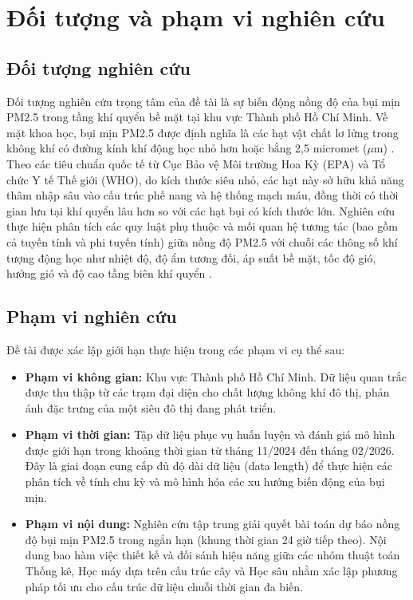     \section{Đối tượng và phạm vi nghiên cứu}
    \subsection{Đối tượng nghiên cứu}
    Đối tượng nghiên cứu trọng tâm của đề tài là sự biến động nồng độ của bụi mịn PM2.5 trong tầng khí quyển bề mặt tại khu vực Thành phố Hồ Chí Minh. Về mặt khoa học, bụi mịn PM2.5 được định nghĩa là các hạt vật chất lơ lửng trong không khí có đường kính khí động học nhỏ hơn hoặc bằng 2,5 micromet ($\mu$m) \cite{Seinfeld2016}. Theo các tiêu chuẩn quốc tế từ Cục Bảo vệ Môi trường Hoa Kỳ (EPA) và Tổ chức Y tế Thế giới (WHO), do kích thước siêu nhỏ, các hạt này sở hữu khả năng thâm nhập sâu vào cấu trúc phế nang và hệ thống mạch máu, đồng thời có thời gian lưu tại khí quyển lâu hơn so với các hạt bụi có kích thước lớn.
    Nghiên cứu thực hiện phân tích các quy luật phụ thuộc và mối quan hệ tương tác (bao gồm cả tuyến tính và phi tuyến tính) giữa nồng độ PM2.5 với chuỗi các thông số khí tượng động học như nhiệt độ, độ ẩm tương đối, áp suất bề mặt, tốc độ gió, hướng gió và độ cao tầng biên khí quyển \cite{Tai2010}. 
    \subsection{Phạm vi nghiên cứu}
    Đề tài được xác lập giới hạn thực hiện trong các phạm vi cụ thể sau:
    \begin{itemize}
        \item \textbf{Phạm vi không gian:} Khu vực Thành phố Hồ Chí Minh. Dữ liệu quan trắc được thu thập từ các trạm đại diện cho chất lượng không khí đô thị, phản ánh đặc trưng của một siêu đô thị đang phát triển.
        \item \textbf{Phạm vi thời gian:} Tập dữ liệu phục vụ huấn luyện và đánh giá mô hình được giới hạn trong khoảng thời gian từ tháng 11/2024 đến tháng 02/2026. Đây là giai đoạn cung cấp đủ độ dài dữ liệu (data length) để thực hiện các phân tích về tính chu kỳ và mô hình hóa các xu hướng biến động của bụi mịn.
        \item \textbf{Phạm vi nội dung:} Nghiên cứu tập trung giải quyết bài toán dự báo nồng độ bụi mịn PM2.5 trong ngắn hạn (khung thời gian 24 giờ tiếp theo). Nội dung bao hàm việc thiết kế và đối sánh hiệu năng giữa các nhóm thuật toán Thống kê, Học máy dựa trên cấu trúc cây và Học sâu nhằm xác lập phương pháp tối ưu cho cấu trúc dữ liệu chuỗi thời gian đa biến.
    \end{itemize}
